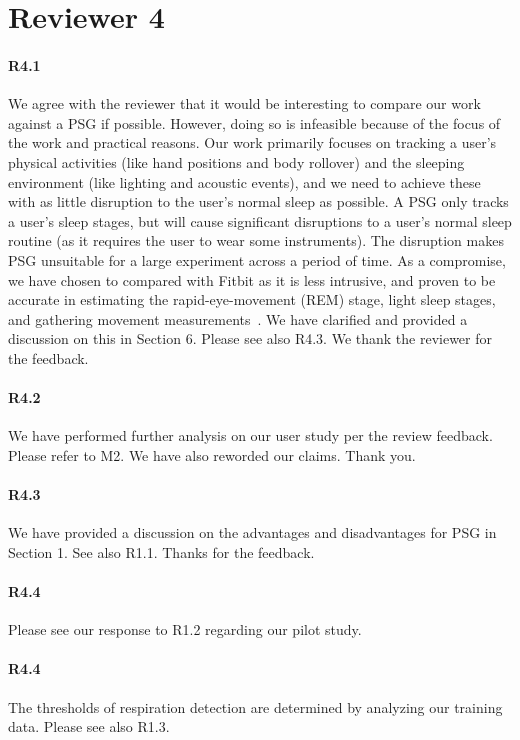 \section*{Reviewer 4}

\paragraph{R4.1} We agree with the reviewer that it would be interesting to compare our work against a PSG if possible. However, doing so
is infeasible because of the focus of the work and practical reasons. Our work primarily focuses on tracking a user's physical activities
(like hand positions and body rollover) and the sleeping environment (like lighting and acoustic events), and we need to achieve these with
as little disruption to the user's normal sleep as possible. A PSG only tracks a user's sleep stages, but will cause significant
disruptions to a user's normal sleep routine (as it requires the user to wear some instruments). The disruption makes PSG unsuitable for a
large experiment across a period of time. As a compromise, we have chosen to compared with Fitbit as it is less intrusive, and proven to be
accurate in estimating the rapid-eye-movement (REM) stage, light sleep stages, and gathering movement
measurements~\cite{fitbit01,fitbit02,fitbit03}. We have clarified and provided a discussion on this in Section 6. Please see also R4.3. We
thank the reviewer for the feedback.

\paragraph{R4.2} We have performed further analysis on our user study per the review feedback. Please refer to M2. We have also reworded our
claims. Thank you.


\paragraph{R4.3} We have provided a discussion on the advantages and disadvantages for PSG in Section 1. See also R1.1. Thanks for the feedback.

\paragraph{R4.4} Please see our response to R1.2 regarding our pilot study.

\paragraph{R4.4} The thresholds of respiration detection are determined by analyzing our training data. Please
see also R1.3.

